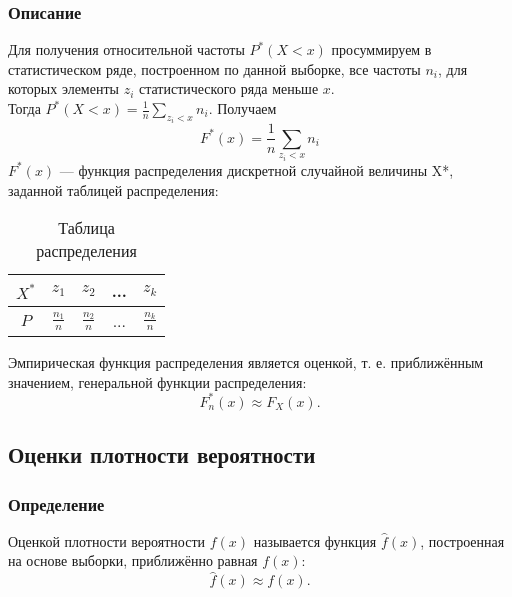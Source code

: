 \documentclass[12pt,a4paper]{article}
\begin{document}
	\subsubsection{Описание}
		Для получения относительной частоты $P^*(X < x)$ просуммируем в статистическом ряде, построенном по данной выборке, все частоты $n_i$, для которых элементы $z_i$ статистического ряда меньше $x$.\\ Тогда $P^*(X<x) = \frac{1}{n}\sum_{z_i < x}n_i$. Получаем
		\begin{equation}\label{eqn:edf_sum}
			F^*(x) = \frac{1}{n}\sum_{z_i < x}n_i
		\end{equation}
		$F^*(x)$ ---  функция распределения дискретной случайной величины X*, заданной таблицей распределения:
		\begin{center}
			\begin{table}[h]
				\begin{center}
					\begin{tabular}{|c|c|c|c|c|}
						\hline
						$X^*$ & $z_1$ & $z_2$ & ... & $z_k$\\
						\hline
						$P$ & $\frac{n_1}{n}$ & $\frac{n_2}{n}$ & ... & $\frac{n_k}{n}$\\
						\hline
					\end{tabular}
				\end{center}
				\caption{Таблица распределения}
			\end{table}
		\end{center}
		Эмпирическая функция распределения является оценкой, т. е. приближённым значением, генеральной функции распределения:
		\begin{equation}\label{eqn:edf_approx}
		F^*_n(x) \approx F_X(x).
		\end{equation}
	
	\subsection{Оценки плотности вероятности}
	\subsubsection{Определение}
		Оценкой плотности вероятности $f(x)$ называется функция $\hat{f}(x)$, построенная на основе выборки, приближённо равная $f(x)$:
		\begin{equation}\label{eqn:pdf_approx}
			\hat{f}(x) \approx f(x).
		\end{equation}
\end{document}
